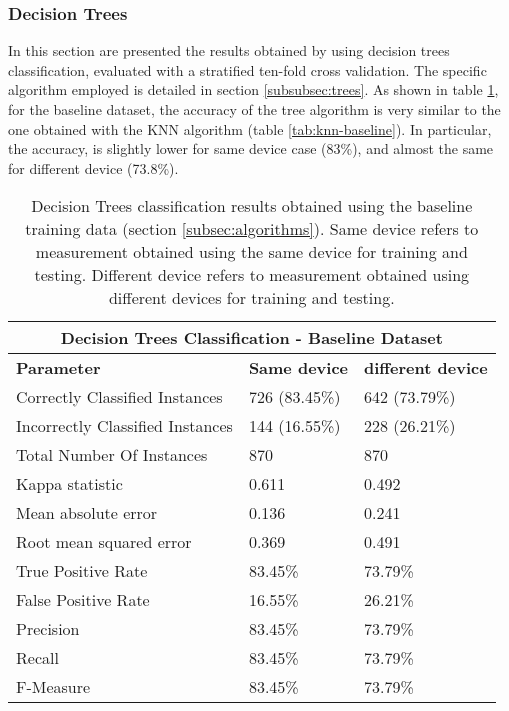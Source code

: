 \subsubsection{Decision Trees}
\label{test-trees}
In this section are presented the results obtained by using decision trees classification, evaluated with a stratified ten-fold cross validation. The specific algorithm employed is detailed in section \ref{subsubsec:trees}. As shown in table \ref{tab:tree-baseline}, for the baseline dataset, the accuracy of the tree algorithm is very similar to the one obtained with the KNN algorithm (table \ref{tab:knn-baseline}). In particular, the accuracy, is slightly lower for same device case (83\%), and almost the same for different device (73.8\%).


\begin{table}
\caption[Decision Trees classification results obtained using the baseline training data.]{Decision Trees classification results obtained using the baseline training data (section \ref{subsec:algorithms}). Same device refers to measurement obtained using the same device for training and testing. Different device refers to measurement obtained using different devices for training and testing.}
\label{tab:tree-baseline}
\begin{tabular}{ |l|l|l| }
  \hline
  \multicolumn{3}{|c|}{\textbf{Decision Trees Classification - Baseline Dataset}} \\
  \hline
  \textbf{Parameter} & \textbf{Same device} & \textbf{different device}\\
  \hline
  Correctly Classified Instances & 726 (83.45\%) & 642 (73.79\%) \\
  Incorrectly Classified Instances & 144 (16.55\%) & 228 (26.21\%) \\
  Total Number Of Instances & 870 & 870 \\
  Kappa statistic & 0.611 & 0.492 \\
  Mean absolute error & 0.136 & 0.241 \\
  Root mean squared error & 0.369 & 0.491 \\
  True Positive Rate & 83.45\% & 73.79\% \\
  False Positive Rate & 16.55\% & 26.21\% \\
  Precision & 83.45\% & 73.79\% \\
  Recall & 83.45\% & 73.79\% \\
  F-Measure & 83.45\% & 73.79\% \\
  \hline
\end{tabular}
\end{table}

